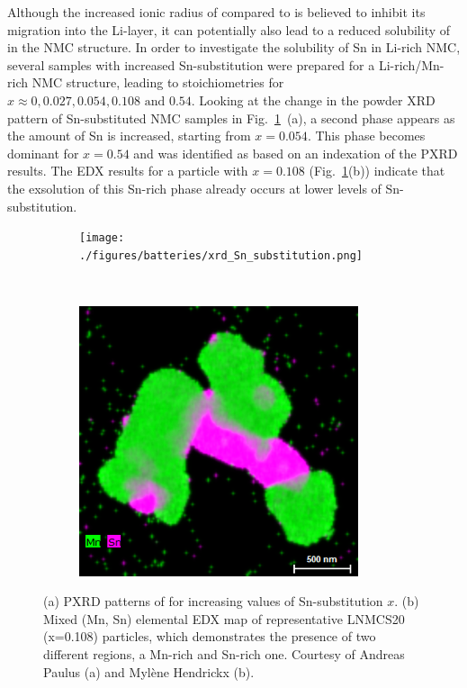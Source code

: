 \begin{refsection}
Although the increased ionic radius of  compared to  
is believed to inhibit its migration into the Li-layer, it can potentially 
also lead to a reduced solubility of  in the NMC structure. In order to 
investigate the solubility of Sn in Li-rich NMC, several samples with 
increased Sn-substitution were prepared for a Li-rich/Mn-rich NMC structure, 
leading to stoichiometries  
for $x  \approx 0, 0.027, 0.054, 0.108 \textrm{ and } 0.54$. Looking at the 
change in the powder XRD pattern of Sn-substituted NMC samples in 
Fig.~\ref{batteries:fig-Sn_experiment}~(a), a second phase appears as the 
amount of Sn is increased, starting from $x = 0.054$. This phase becomes dominant for $x=0.54$ and was 
identified as  based on an indexation of the PXRD results. 
The EDX results for a particle with $x=0.108$ 
(Fig.~\ref{batteries:fig-Sn_experiment}(b)) indicate that the exsolution of this 
Sn-rich phase already occurs at lower levels of Sn-substitution. 
 
\begin{figure}[ht] 
    \centering
    \captionsetup{width=0.92\linewidth}
    \begin{subfigure}[t]{0.65\textwidth} 
        \centering 
        \texttt{[image: ./figures/batteries/xrd\_Sn\_substitution.png]} 
        \caption{} 
    \end{subfigure}%
    ~  
    \begin{subfigure}[t]{0.34\textwidth} 
        \centering 
        \includegraphics[width=0.9\textwidth]{./figures/batteries/edx_Sn_substitution.png} 
        \caption{} 
    \end{subfigure} 
    \caption{(a) PXRD patterns of 
 for increasing values of 
Sn-substitution $x$. (b) Mixed (Mn, Sn) elemental EDX map of representative 
LNMCS20 (x=0.108) particles, which demonstrates the presence of two different regions, a Mn-rich and Sn-rich one. Courtesy of Andreas Paulus (a) and Myl\`ene 
Hendrickx (b).} 
    \label{batteries:fig-Sn_experiment} 
\end{figure} 
 

\end{refsection}
